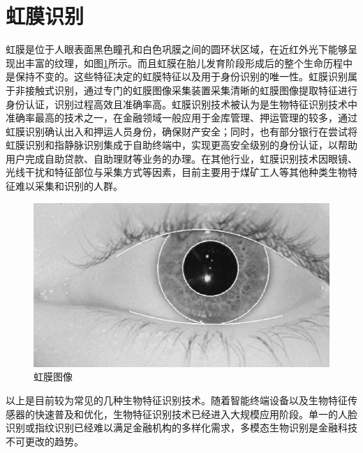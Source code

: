 \section{虹膜识别}

虹膜是位于人眼表面黑色瞳孔和白色巩膜之间的圆环状区域，在近红外光下能够呈现出丰富的纹理，如图\ref{fig:iris_img}所示。而且虹膜在胎儿发育阶段形成后的整个生命历程中是保持不变的。这些特征决定的虹膜特征以及用于身份识别的唯一性。虹膜识别属于非接触式识别，通过专门的虹膜图像采集装置采集清晰的虹膜图像提取特征进行身份认证，识别过程高效且准确率高。虹膜识别技术被认为是生物特征识别技术中准确率最高的技术之一，在金融领域一般应用于金库管理、押运管理的较多，通过虹膜识别确认出入和押运人员身份，确保财产安全；同时，也有部分银行在尝试将虹膜识别和指静脉识别集成于自助终端中，实现更高安全级别的身份认证，以帮助用户完成自助贷款、自助理财等业务的办理。在其他行业，虹膜识别技术因眼镜、光线干扰和特征部位与采集方式等因素，目前主要用于煤矿工人等其他种类生物特征难以采集和识别的人群。

\begin{figure}[ht]
\centering
\includegraphics[scale=0.6]{img/chapter_br/iris_img.png}
\caption{虹膜图像\cite{daugman2009iris}}
\label{fig:iris_img}
\end{figure}

以上是目前较为常见的几种生物特征识别技术。随着智能终端设备以及生物特征传感器的快速普及和优化，生物特征识别技术已经进入大规模应用阶段。单一的人脸识别或指纹识别已经难以满足金融机构的多样化需求，多模态生物识别是金融科技不可更改的趋势。
